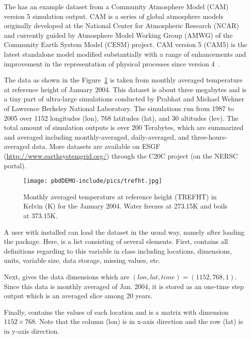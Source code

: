 The  has an example dataset  from a
Community Atmosphere Model (CAM) version 5 simulation output.
CAM is a series of global atmosphere models originally developed at the 
National Center for Atmospheric Research (NCAR) and currently guided by 
Atmosphere Model Working Group (AMWG) of the Community Earth System Model (CESM)
project. CAM version 5 (CAM5) is the latest standalone model modified
substantially with a range of enhancements and improvement in the 
representation of physical processes since version 4~\citep{CAM5,CESM1}.

The data  as shown in the Figure~\ref{fig:trefht}
is taken from monthly averaged temperature at reference height of January 2004.
This dataset is about three megabytes and is a tiny part of ultra-large 
simulations conducted by Prabhat and Michael Wehner of Lawrence Berkeley 
National Laboratory. The simulations run from 1987 to 2005 over 1152 longitudes 
(lon), 768 latitudes (lat), and 30 altitudes (lev). The total amount of 
simulation outputs is over 200 Terabytes, which are summarized and averaged 
including monthly-averaged, daily-averaged, and three-hours-averaged data.
More datasets are available on ESGF (\url{http://www.earthsystemgrid.org/})
through the C20C project (on the NERSC portal).
\begin{figure}[t]
  \centering
  \texttt{[image: pbdDEMO-include/pics/trefht.jpg]}
  \caption[Monthly averaged temperature]{Monthly averaged temperature at reference height (TREFHT) in
           Kelvin (K) for the January 2004. Water freezes at 273.15K and
           boils at 373.15K.}
  \label{fig:trefht}
\end{figure}

A user with  installed can load the  dataset in 
the usual way, namely  after loading the  
package.  Here,  is a list consisting of several elements. First, 
 contains all definitions regarding to this variable in
class  including locations, dimensions, 
units, variable size, data storage, missing values, etc. 

Next,  gives the data dimensions which are
$(lon, lat, time) = (1152, 768, 1)$. Since this data is monthly averaged
of Jan. 2004, it is stored as an one-time step output which is
an averaged slice among 20 years.

Finally,  contains the values of each
location and is a matrix with dimension $1152\times 768$. Note that the column 
(lon) is in x-axis direction and the row (lat) is in y-axis direction.


